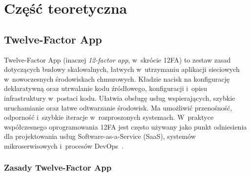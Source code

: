 \newpage

\section{Część teoretyczna}

\subsection{Twelve-Factor App}

Twelve-Factor App (inaczej \textit{12-factor app}, w~skrócie 12FA) to zestaw zasad dotyczących budowy skalowalnych, łatwych w~utrzymaniu aplikacji sieciowych w~nowoczesnych środowiskach chmurowych.
Kładzie nacisk na konfigurację deklaratywną oraz utrwalanie kodu źródłowego, konfiguracji i~opisu infrastruktury w~postaci kodu. Ułatwia obsługę usług wspierających, szybkie uruchamianie oraz łatwe odtwarzanie środowisk. Ma umożliwić przenośność, odporność i~szybkie iteracje w~rozproszonych systemach.
W~praktyce współczesnego oprogramowania 12FA jest często używany jako punkt odniesienia dla projektowania usług Software-as-a-Service (SaaS),
systemów mikroserwisowych i~procesów DevOps~\cite{Wiggins2012TwelveFactor,Kosinska2023CloudNativeKnowledge}.

\subsubsection{Zasady Twelve-Factor App}

